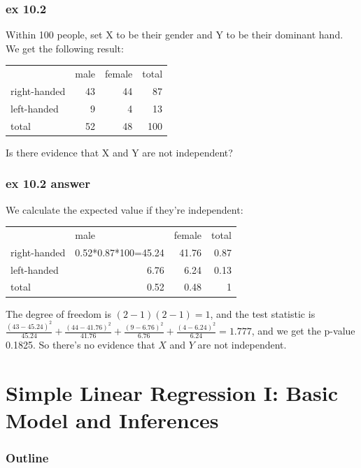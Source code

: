 \documentclass{beamer}
\begin{document}
\begin{frame}
    \frametitle{ex 10.2}

    Within 100 people, set X to be their gender and Y to be their dominant hand. We get the following result:

\begin{table}[H]
    \centering
      \begin{tabular}{lrrr}
            & \multicolumn{1}{l}{male} & \multicolumn{1}{l}{female} & \multicolumn{1}{l}{total} \\
      right-handed & 43    & 44    & 87 \\
      left-handed & 9     & 4     & 13 \\
      total & 52    & 48    & 100 \\
      \end{tabular}%
    
  \end{table}%
  Is there evidence that X and Y are not independent?
\end{frame}

\begin{frame}
    \frametitle{ex 10.2 answer}

    We calculate the expected value if they're independent:
    \begin{table}[H]
        \centering
          \begin{tabular}{lrrr}
                & \multicolumn{1}{l}{male} & \multicolumn{1}{l}{female} & \multicolumn{1}{l}{total} \\
          right-handed & 0.52*0.87*100=45.24    & 41.76    & 0.87 \\
          left-handed & 6.76     & 6.24     & 0.13 \\
          total & 0.52    & 0.48    & 1 \\
          \end{tabular}%
        
      \end{table}
      The degree of freedom is $(2-1)(2-1)=1$, and the test statistic is $\frac{(43-45.24)^2}{45.24}+\frac{(44-41.76)^2}{41.76}+\frac{(9-6.76)^2}{6.76}+\frac{(4-6.24)^2}{6.24}=1.777$, and we get the p-value 0.1825. So there's no evidence that $X$ and $Y$ are not independent.

\end{frame}

\section{Simple Linear Regression I:
Basic Model and Inferences}
\begin{frame}
    \frametitle{Outline}
    \tableofcontents[currentsection]
\end{frame}
\end{document}
